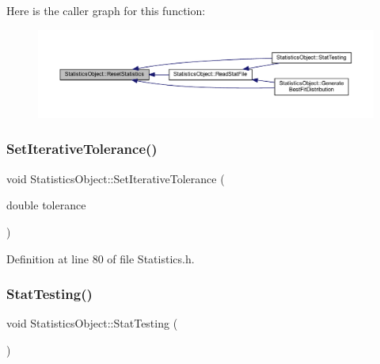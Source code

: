 Here is the caller graph for this function\+:\nopagebreak
\begin{figure}[H]
\begin{center}
\leavevmode
\includegraphics[width=350pt]{class_statistics_object_aafceb8d5caaffc3482e5f9be760fc953_icgraph}
\end{center}
\end{figure}
\mbox{\label{class_statistics_object_ae820e4df3a29f2627a4ba5c3ac0b7862}} 
\subsubsection{\texorpdfstring{Set\+Iterative\+Tolerance()}{SetIterativeTolerance()}}
{\footnotesize\ttfamily void Statistics\+Object\+::\+Set\+Iterative\+Tolerance (\begin{DoxyParamCaption}\item[{double}]{tolerance }\end{DoxyParamCaption})\hspace{0.3cm}{\ttfamily [inline]}}



Definition at line 80 of file Statistics.\+h.

\mbox{\label{class_statistics_object_a9545eace92c4a478cf20dba20f8e51bf}} 
\subsubsection{\texorpdfstring{Stat\+Testing()}{StatTesting()}}
{\footnotesize\ttfamily void Statistics\+Object\+::\+Stat\+Testing (\begin{DoxyParamCaption}{ }\end{DoxyParamCaption})}



